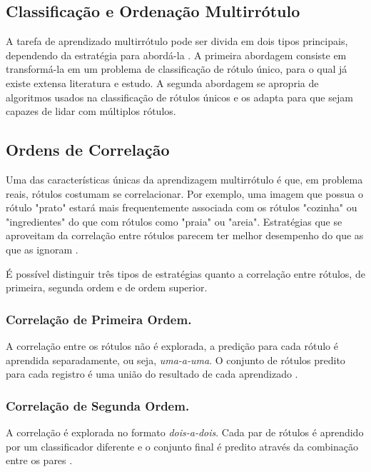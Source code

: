 \documentclass[runningheads,a4paper]{llncs}
\begin{document}
\subsection{Classificação e Ordenação Multirrótulo}\label{subsec:classord}

A tarefa de aprendizado multirrótulo pode ser divida em dois tipos principais, dependendo da estratégia para abordá-la \cite{Tsoumakas2009-vw}. A primeira abordagem consiste em transformá-la em um problema de classificação de rótulo único, para o qual já existe extensa literatura e estudo. A segunda abordagem se apropria de algoritmos usados na classificação de rótulos únicos e os adapta para que sejam capazes de lidar com múltiplos rótulos.

\subsection{Ordens de Correlação}\label{subsec:ordcorr}

Uma das características únicas da aprendizagem multirrótulo é que, em problema reais, rótulos costumam se correlacionar. Por exemplo, uma imagem que possua o rótulo "prato" estará mais frequentemente associada com os rótulos "cozinha" ou "ingredientes" do que com rótulos como "praia" ou "areia". Estratégias que se aproveitam da correlação entre rótulos parecem ter melhor desempenho do que as que as ignoram \cite{Zhang2010-ee}.
 
É possível distinguir três tipos de estratégias quanto a correlação entre rótulos, de primeira, segunda ordem e de ordem superior.

\subsubsection{Correlação de Primeira Ordem.}

A correlação entre os rótulos não é explorada, a predição para cada rótulo é aprendida separadamente, ou seja, \emph{uma-a-uma}. O conjunto de rótulos predito para cada registro é uma união do resultado de cada aprendizado \cite{De_Carvalho2009-yp}.

\subsubsection{Correlação de Segunda Ordem.}

A correlação é explorada no formato \emph{dois-a-dois}. Cada par de rótulos é aprendido por um classificador diferente e o conjunto final é predito através da combinação entre os pares \cite{Hullermeier2008-co}.
\end{document}
